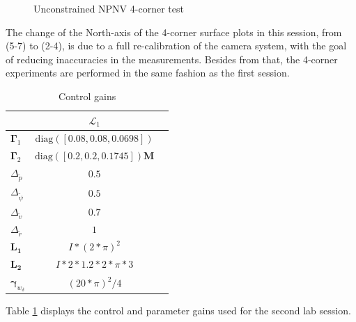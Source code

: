 \begin{figure}[!h]
    \centering
    \caption{Unconstrained NPNV 4-corner test }
\end{figure}\label{NPNV4corner2}


The change of the North-axis of the 4-corner surface plots in this session, from (5-7) to (2-4), is due to a full re-calibration of the camera system, with the goal of reducing inaccuracies in the measurements. Besides from that, the 4-corner experiments are performed in the same fashion as the first session. 





\begin{table}[h!]
\centering
\caption{Control gains}\label{table:gains1}
\begin{tabular}{|l |c|r|}
\toprule
& \textbf{$\mathcal{L}_1$}  \\
\midrule
\hline
$\boldsymbol{\Gamma}_1$ & $\text{diag}([0.08,0.08,0.0698])$  \\

$\boldsymbol{\Gamma}_2$  & $\text{diag}([0.2,0.2,0.1745])\boldsymbol{M}$   \\

$\Delta_{\tilde{p}}$  & $0.5$    \\
$\Delta_{\tilde{\psi}}$  & $0.5$    \\

$\Delta_{\tilde{v}}$  & $0.7$ \\
$\Delta_{\tilde{r}}$  & $1$ \\
$\boldsymbol{L_1}$  & $I*(2*\pi)^2$ \\
$\boldsymbol{L_2}$  & $I*2*1.2*2*\pi*3$ \\
$\boldsymbol{\gamma}_w_{\delta}$  & $(20*\pi)^2/4$ \\\hline
\bottomrule

\end{tabular}
\end{table}
Table \ref{table:gains1} displays the control and parameter gains used for the second lab session. 

